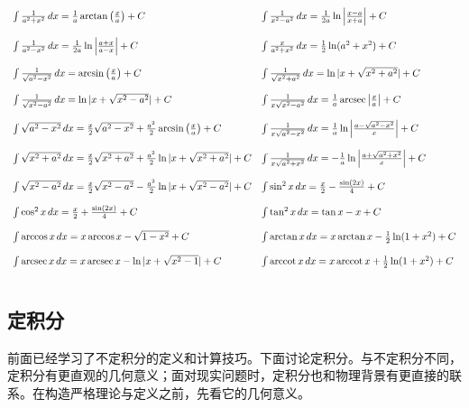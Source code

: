 \[
\begin{array}{ll}
\int \frac{1}{a^2+x^2}\,dx=\frac{1}{a}\arctan\left(\frac{x}{a}\right)+C & \int \frac{1}{x^2-a^2}\,dx=\frac{1}{2a}\ln\left|\frac{x-a}{x+a}\right|+C \\ \\
\int \frac{1}{a^2-x^2}\,dx=\frac{1}{2a}\ln\left|\frac{a+x}{a-x}\right|+C & \int \frac{x}{a^2+x^2}\,dx=\frac{1}{2}\ln(a^2+x^2)+C \\ \\
\int \frac{1}{\sqrt{a^2-x^2}}\,dx=\arcsin\left(\frac{x}{a}\right)+C & \int \frac{1}{\sqrt{x^2+a^2}}\,dx=\ln|x+\sqrt{x^2+a^2}|+C \\ \\
\int \frac{1}{\sqrt{x^2-a^2}}\,dx=\ln|x+\sqrt{x^2-a^2}|+C & \int \frac{1}{x\sqrt{x^2-a^2}}\,dx=\frac{1}{a}\operatorname{arcsec}\left|\frac{x}{a}\right|+C \\ \\
\int \sqrt{a^2-x^2}\,dx=\frac{x}{2}\sqrt{a^2-x^2}+\frac{a^2}{2}\arcsin\left(\frac{x}{a}\right)+C & \int \frac{1}{x\sqrt{a^2-x^2}}\,dx=\frac{1}{a}\ln\left|\frac{a-\sqrt{a^2-x^2}}{x}\right|+C \\ \\
\int \sqrt{x^2+a^2}\,dx=\frac{x}{2}\sqrt{x^2+a^2}+\frac{a^2}{2}\ln|x+\sqrt{x^2+a^2}|+C & \int \frac{1}{x\sqrt{a^2+x^2}}\,dx=-\frac{1}{a}\ln\left|\frac{a+\sqrt{a^2+x^2}}{x}\right|+C \\ \\
\int \sqrt{x^2-a^2}\,dx=\frac{x}{2}\sqrt{x^2-a^2}-\frac{a^2}{2}\ln|x+\sqrt{x^2-a^2}|+C & \int \sin^2x\,dx=\frac{x}{2}-\frac{\sin(2x)}{4}+C \\ \\
\int \cos^2x\,dx=\frac{x}{2}+\frac{\sin(2x)}{4}+C & \int \tan^2x\,dx=\tan x-x+C \\ \\
\int \arccos x\,dx=x\arccos x-\sqrt{1-x^2}+C & \int \arctan x\,dx=x\arctan x-\frac{1}{2}\ln(1+x^2)+C \\ \\
\int \operatorname{arcsec} x\,dx=x\operatorname{arcsec} x-\ln|x+\sqrt{x^2-1}|+C & \int \operatorname{arccot} x\,dx=x\operatorname{arccot} x+\frac{1}{2}\ln(1+x^2)+C \\ \\
\end{array}
\]

\subsection{定积分}

前面已经学习了不定积分的定义和计算技巧。下面讨论定积分。与不定积分不同，定积分有更直观的几何意义；面对现实问题时，定积分也和物理背景有更直接的联系。在构造严格理论与定义之前，先看它的几何意义。

